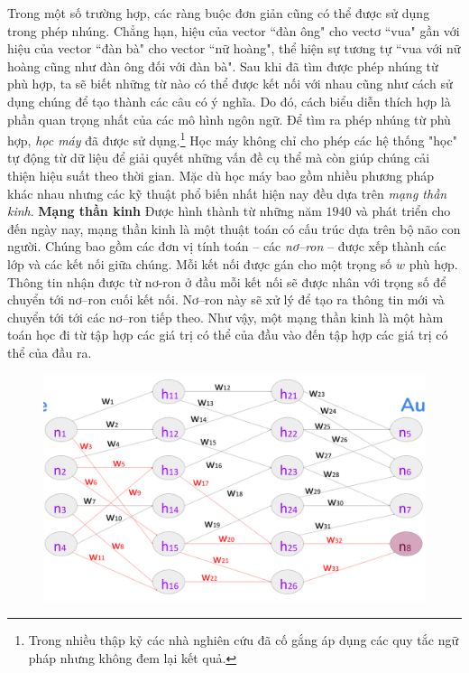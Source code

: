 \begin{multicols}{2}
	\vskip 0.1cm
	Trong một số trường hợp, các ràng buộc đơn giản cũng có thể được sử dụng trong phép nhúng. Chẳng hạn, hiệu của vector ``đàn ông" cho vectơ ``vua" gần với hiệu của vector ``đàn bà" cho vector ``nữ hoàng", thể hiện sự tương tự ``vua với nữ hoàng cũng như đàn ông đối với đàn bà".
	\vskip 0.1cm
	Sau khi đã tìm được phép nhúng từ phù hợp, ta sẽ biết những từ nào có thể được kết nối với nhau cũng như cách sử dụng chúng để tạo thành các câu có ý nghĩa. Do đó, cách biểu diễn thích hợp là phần quan trọng nhất của các mô hình ngôn ngữ. 
	\vskip 0.1cm
	Để tìm ra phép nhúng từ phù hợp, \textit{học máy} đã được sử dụng.\footnote[2]{\color{timhieukhoahoc}Trong nhiều thập kỷ các nhà nghiên cứu đã cố gắng áp dụng các quy tắc ngữ pháp nhưng không đem lại kết quả.} Học máy không chỉ cho phép các hệ thống "học" tự động từ dữ liệu để giải quyết những vấn đề cụ thể mà còn giúp chúng cải thiện hiệu suất theo thời gian. Mặc dù học máy bao gồm nhiều phương pháp khác nhau nhưng các kỹ thuật phổ biến nhất hiện nay đều dựa trên \textit{mạng thần kinh}.
	\vskip 0.1cm
	\textbf{\color{timhieukhoahoc}Mạng thần kinh}
	\vskip 0.1cm
	Được hình thành từ những năm $1940$ và phát triển cho đến ngày nay, mạng thần kinh là một thuật toán có cấu trúc dựa trên bộ não con người. Chúng bao gồm các đơn vị tính toán -- các \textit{nơ--ron} -- được xếp thành các lớp và các kết nối giữa chúng. Mỗi kết nối được gán cho một trọng số $w$ phù hợp. Thông tin nhận được từ nơ-ron ở đầu mỗi kết nối sẽ được nhân với trọng số  để chuyển tới nơ--ron cuối kết nối. Nơ--ron này sẽ xử lý để tạo ra thông tin mới và chuyển tới tới các nơ--ron tiếp theo. Như vậy, một mạng thần kinh là một hàm toán học đi từ tập hợp các giá trị có thể của đầu vào đến tập hợp các giá trị có thể của đầu ra.
	\begin{figure}[H]
		\vspace*{-5pt}
		\centering
		\captionsetup{labelformat= empty, justification=centering}
		\includegraphics[width= 1\linewidth]{Neuronales_Netz1.png}

\end{figure}
\end{multicols}
